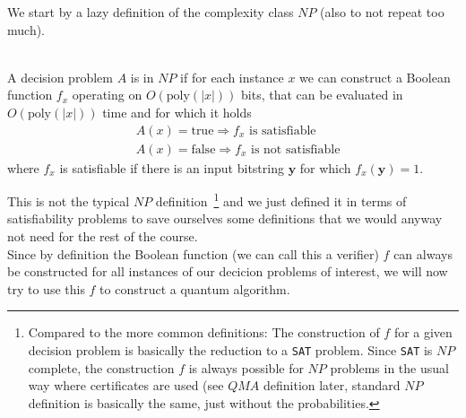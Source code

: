 We start by a lazy definition of the complexity class $NP$ (also to not repeat too much).
\begin{def*}[$NP$]\phantom{...}\\
A decision problem $A$ is in $NP$ if for each instance $x$ we can construct a Boolean function $f_x$ operating on $O(\text{poly}(|x|))$ bits, that can be evaluated in $O(\text{poly}(|x|))$ time and for which it holds
\begin{align}
    &A(x)=\text{true} \Rightarrow f_x \text{ is satisfiable} \\
    &A(x)=\text{false} \Rightarrow f_x \text{ is not satisfiable} 
\end{align}
where $f_x$ is satisfiable if there is an input bitstring $\mathbf{y}$ for which $f_x(\mathbf{y})=1$.
\end{def*}
This is not the typical $NP$ definition~\footnote{Compared to the more common definitions: The construction of $f$ for a given decision problem is basically the reduction to a \texttt{SAT} problem. Since \texttt{SAT} is $NP$ complete, the construction $f$ is always possible for $NP$ problems in the usual way where certificates are used (see $QMA$ definition later, standard $NP$ definition is basically the same, just without the probabilities.} and we just defined it in terms of satisfiability problems to save ourselves some definitions that we would anyway not need for the rest of the course.\\ 
Since by definition the Boolean function (we can call this a verifier) $f$ can always be constructed for all instances of our decicion problems of interest, we will now try to use this $f$ to construct a quantum algorithm.

